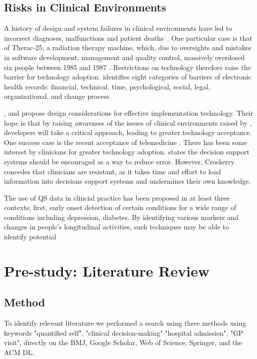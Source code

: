 \documentclass{sigchi}
\begin{document}
\subsection{Risks in Clinical Environments}
A history of design and system failures in clinical environments have led to incorrect diagnoses, malfunctions and patient deaths~\cite{Leveson1993}. One particular case is that of Therac-25, a radiation therapy machine, which, due to oversights and mistakes in software development, management and quality control, massively overdosed six people between 1985 and 1987 \cite{Leveson1993}. Restrictions on technology therefore raise the barrier for technology adoption. \cite{Boonstra2010} identifies eight categories of barriers of electronic health records: financial, technical, time, psychological, social, legal, organizational, and change process.

\cite{Beuscart-Zephir1997}, \cite{Ovretveit2007} and \cite{Taneva2014} propose design considerations for effective implementation technology. Their hope is that by raising awareness of the issues of clinical environments raised by \cite{Boonstra2010}, developers will take a critical approach, leading to greater technology acceptance. One success case is the recent acceptance of telemedicine \cite{Chau2002}. There has been some interest by clinicians for greater technology adoption. \cite{Croskerry2013a} states the decision support systems should be encouraged as a way to reduce error. However, Croskerry concedes that clinicians are resistant, as it takes time and effort to load information into decisions support systems and undermines their own knowledge.

The use of QS data in clincial practice has been proposed in at least three contexts; first, early onset detection of certain conditions for a wide range of conditions including depression, diabetes. By identifying various markers and changes in people's longitudinal activities, such techniques may be able to identify potential 

\section{Pre-study: Literature Review} 

\subsection{Method}
To identify relevant literature we performed a search using three methods using keywords "quantified self", "clinical decision-making" "hospital admission", "GP visit", directly on the BMJ, Google Scholar, Web of Science, Springer, and the ACM DL.
\end{document}
